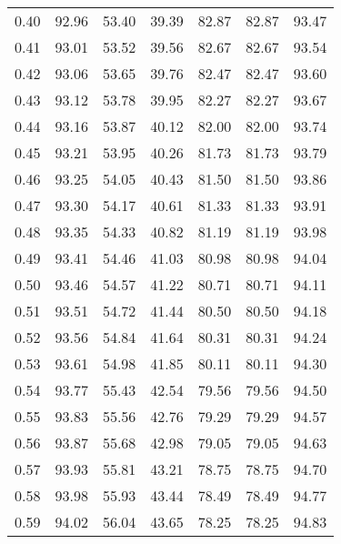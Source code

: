 \begin{tabular}{|c|c|c|c|c|c|c|}
      0.40 &     92.96 &     53.40 &      39.39 &   82.87 &      82.87 &         93.47 \\
      0.41 &     93.01 &     53.52 &      39.56 &   82.67 &      82.67 &         93.54 \\
      0.42 &     93.06 &     53.65 &      39.76 &   82.47 &      82.47 &         93.60 \\
      0.43 &     93.12 &     53.78 &      39.95 &   82.27 &      82.27 &         93.67 \\
      0.44 &     93.16 &     53.87 &      40.12 &   82.00 &      82.00 &         93.74 \\
      0.45 &     93.21 &     53.95 &      40.26 &   81.73 &      81.73 &         93.79 \\
      0.46 &     93.25 &     54.05 &      40.43 &   81.50 &      81.50 &         93.86 \\
      0.47 &     93.30 &     54.17 &      40.61 &   81.33 &      81.33 &         93.91 \\
      0.48 &     93.35 &     54.33 &      40.82 &   81.19 &      81.19 &         93.98 \\
      0.49 &     93.41 &     54.46 &      41.03 &   80.98 &      80.98 &         94.04 \\
      0.50 &     93.46 &     54.57 &      41.22 &   80.71 &      80.71 &         94.11 \\
      0.51 &     93.51 &     54.72 &      41.44 &   80.50 &      80.50 &         94.18 \\
      0.52 &     93.56 &     54.84 &      41.64 &   80.31 &      80.31 &         94.24 \\
      0.53 &     93.61 &     54.98 &      41.85 &   80.11 &      80.11 &         94.30 \\
      0.54 &     93.77 &     55.43 &      42.54 &   79.56 &      79.56 &         94.50 \\
      0.55 &     93.83 &     55.56 &      42.76 &   79.29 &      79.29 &         94.57 \\
      0.56 &     93.87 &     55.68 &      42.98 &   79.05 &      79.05 &         94.63 \\
      0.57 &     93.93 &     55.81 &      43.21 &   78.75 &      78.75 &         94.70 \\
      0.58 &     93.98 &     55.93 &      43.44 &   78.49 &      78.49 &         94.77 \\
      0.59 &     94.02 &     56.04 &      43.65 &   78.25 &      78.25 &         94.83 \\

\end{tabular}
